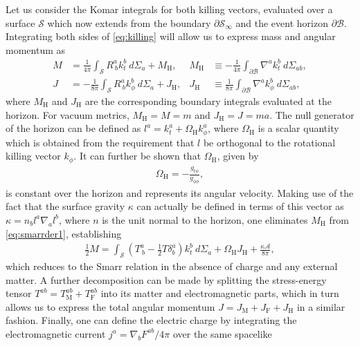 \documentclass[
twoside,
openright,
frontopenright,
]{dmathesis}
\newcommand{\nn}{\nonumber}
\begin{document}
Let us consider the Komar integrals for both killing vectors, evaluated over a
surface $\mathcal{S}$ which now extends from the boundary
$\partial \mathcal{S}_\infty$ and the event horizon $\partial
\mathcal{B}$. Integrating both sides of \cref{eq:killing} will allow us to
express mass and angular momentum as
\begin{align}
  M &= \frac{1}{4\pi}\int_\mathcal{S} R^a_{~b}k^b_t ~d\Sigma_a + M_\mathrm{H}, 
  &M_\mathrm{H} &\equiv -\frac{1}{4\pi}\int_{\partial \mathcal{B}}\nabla^a k_t^b ~ d\Sigma_{ab},\nn\\
  J &= -\frac{1}{8\pi}\int_\mathcal{S} R^a_{~b}k^b_\phi ~d\Sigma_a + J_\mathrm{H}, 
  &J_\mathrm{H} &\equiv \frac{1}{8\pi}\int_{\partial\mathcal{B}}\nabla^a k_\phi^b ~ d\Sigma_{ab},
\label{eq:smarrder1}
\end{align}
where $M_\mathrm{H}$ and $J_\mathrm{H}$ are the corresponding boundary integrals
evaluated at the horizon. For vacuum metrics, $M_\mathrm{H}=M=m$ and
$J_\mathrm{H}=J=ma$. The null generator of the horizon can be defined as
$l^a = k_t^a + \Omega_\mathrm{H} k_\phi^a$, where $\Omega_\mathrm{H}$ is a
scalar quantity which is obtained from the requirement that $l$ be orthogonal to
the rotational killing vector $k_\phi$. It can further be shown that
$\Omega_\mathrm{H}$, given by
\begin{align}
  \label{eq:angularvelocity}
  \Omega_\mathrm{H} = -\frac{g_{t\phi}}{g_{\phi\phi}},
\end{align}
is constant over the horizon and represents its angular velocity. Making use of
the fact that the surface gravity $\kappa$ can actually be defined in terms of
this vector as $\kappa = n_bl^a\nabla_al^b$, where $n$ is the unit normal to the
horizon, one eliminates $M_\mathrm{H}$ from \cref{eq:smarrder1}, establishing
\begin{align}
  \label{eq:smarrder2}
  \frac12 M = \int_\mathcal{S} \left(T^a_{~b} - \frac12 T \delta^a_b\right)k_t^b~d\Sigma_a + \Omega_\mathrm{H}
  J_\mathrm{H} + \frac{\kappa \mathcal{A}}{8\pi},
\end{align}
which reduces to the Smarr relation in the absence of charge and any external
matter. A further decomposition can be made by splitting the stress-energy
tensor $T^{ab} = T_\mathrm{M}^{ab} + T_\mathrm{F}^{ab}$ into its matter and
electromagnetic parts, which in turn allows us to express the total angular
momentum $J = J_\mathrm{M} + J_\mathrm{F} + J_\mathrm{H}$ in a similar
fashion. Finally, one can define the electric charge by integrating the
electromagnetic current $j^a = \nabla_b F^{ab}/4\pi$ over the same spacelike
\end{document}

